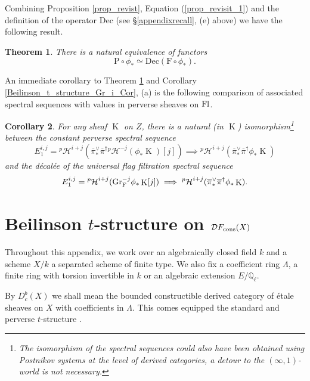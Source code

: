\documentclass[12pt, reqno]{amsart}
\theoremstyle{plain}
\newtheorem{thm}{\bf Theorem}[subsection]
\newtheorem{cor}[thm]{\bf Corollary}
\theoremstyle{definition}
\theoremstyle{definition}
\newcommand{\bbQ}{{\mathbb Q}}
\newcommand{\cD}{{\mathcal D}}
\newcommand{\cpH}{{^p\mathcal{H}}}
\DeclareMathOperator{\KK}{K}
\begin{document}
Combining Proposition \ref{prop_revist}, Equation (\ref{prop_revisit_1}) and the definition of the operator \textup{Dec} (see \S \ref{appendixrecall}, (e) above) we have the following result.

\begin{thm}\label{P_Dec_F_Functor}
  There is a natural equivalence of functors
  \[
  \mathrm{P} \circ \phi_* \simeq \mathrm{Dec}(\mathrm{F}\circ\phi_*).
  \]
\end{thm}

An immediate corollary to Theorem \ref{P_Dec_F_Functor} and Corollary \ref{Beilinson_t_structure_Gr_i_Cor}, (a) is the following comparison of associated spectral sequences \cite[Proposition 1.2.2.14]{HA} with values in perverse sheaves on $\textup{Fl}$. 

\begin{cor}\label{iso_spectral_sequence}
   For any sheaf $\KK$ on $Z$, there is a natural (in $\KK$) isomorphism\footnote{The isomorphism of the spectral sequences could also have been obtained using Postnikov systems at the level of derived categories, a detour to the $(\infty,1)$-world is not necessary.} between the constant perverse spectral sequence
   \[
   E_1^{i,j}=\cpH^{i+j}(\overline{\pi}^{\vee}_{*}\overline{\pi}^{\dagger}\cpH^{-j}(\phi_*\KK)[j]) \implies \cpH^{i+j}(\overline{\pi}^{\vee}_{*}\overline{\pi}^{\dagger}\phi_*\KK)
   \]
   \noindent and the  d\'ecal\'ee of the universal flag filtration spectral sequence
   \[
   E_1^{i,j}=\cpH^{i+j}(\textup{Gr}^{-j}_{\textup{F}}\phi_*\KK[j]) \implies \cpH^{i+j}(\overline{\pi}^{\vee}_{*}\overline{\pi}^{\dagger}\phi_*\KK).
   \]
   
\end{cor}


\appendix 

\section{Beilinson $t$-structure on $\cD F_{\textup{cons}}(X)$}\label{appendix}

Throughout this appendix, we work over an algebraically closed field $k$ and a scheme $X/k$ a separated scheme of finite type. We also fix a coefficient ring $\Lambda$, a finite ring with torsion invertible in $k$ or an algebraic extension $E/\bbQ_{\ell}$.

By $D^b_c(X)$ we shall mean the bounded constructible derived category of \'etale sheaves on $X$ with coefficients in $\Lambda$. This comes equipped the standard \cite[1.1.2, (e)]{Del80} and perverse $t$-structure \cite[\S 4.0]{BBDG18}. 
\end{document}

